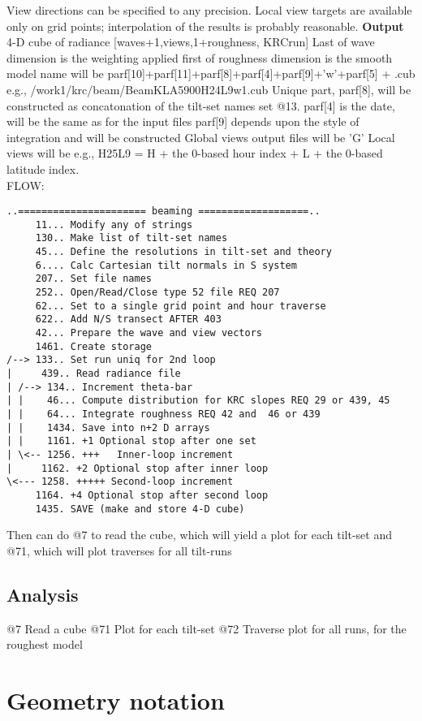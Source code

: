 \documentclass{article}
\begin{document}
View directions can be specified to any precision. Local view targets are
available only on grid points; interpolation of the results is probably
reasonable.
\textbf{Output}  4-D cube of radiance [waves+1,views,1+roughness, KRCrun]
\qii Last of wave dimension is the weighting applied
\qii first of roughness dimension is the smooth model
\qi  name will be  parf[10]+parf[11]+parf[8]+parf[4]+parf[9]+'w'+parf[5]  + .cub
\qiii e.g., /work1/krc/beam/BeamKLA5900H24L9w1.cub
\qii Unique part, parf[8], will be constructed as concatonation of the tilt-set names set @13.
\qii parf[4] is the date, will be the same as for the input files
\qii parf[9] depends upon the style of integration and will be constructed
\qiii  Global views output files will be 'G' 
\qiii Local views will be  e.g., H25L9 =  H + the 0-based hour index + L + the 0-based latitude index.
\\ FLOW:
\vspace{-3.mm} 
\begin{verbatim}
..====================== beaming ===================..
     11... Modify any of strings
     130.. Make list of tilt-set names
     45... Define the resolutions in tilt-set and theory 
     6.... Calc Cartesian tilt normals in S system
     207.. Set file names
     252.. Open/Read/Close type 52 file REQ 207
     62... Set to a single grid point and hour traverse
     622.. Add N/S transect AFTER 403
     42... Prepare the wave and view vectors
     1461. Create storage
/--> 133.. Set run uniq for 2nd loop
|     439.. Read radiance file
| /--> 134.. Increment theta-bar
| |    46... Compute distribution for KRC slopes REQ 29 or 439, 45
| |    64... Integrate roughness REQ 42 and  46 or 439 
| |    1434. Save into n+2 D arrays
| |    1161. +1 Optional stop after one set
| \<-- 1256. +++   Inner-loop increment
|     1162. +2 Optional stop after inner loop
\<--- 1258. +++++ Second-loop increment
     1164. +4 Optional stop after second loop
     1435. SAVE (make and store 4-D cube)
\end{verbatim}

 Then can do @7 to read the cube, which will yield a plot for each tilt-set
\qi and @71, which will plot traverses for all tilt-runs
\subsection{Analysis}
@7 Read a cube
\qi @71  Plot for each tilt-set
\qi @72 Traverse plot for all runs, for the roughest model


\section{Geometry notation \label{geom}}
\end{document}
